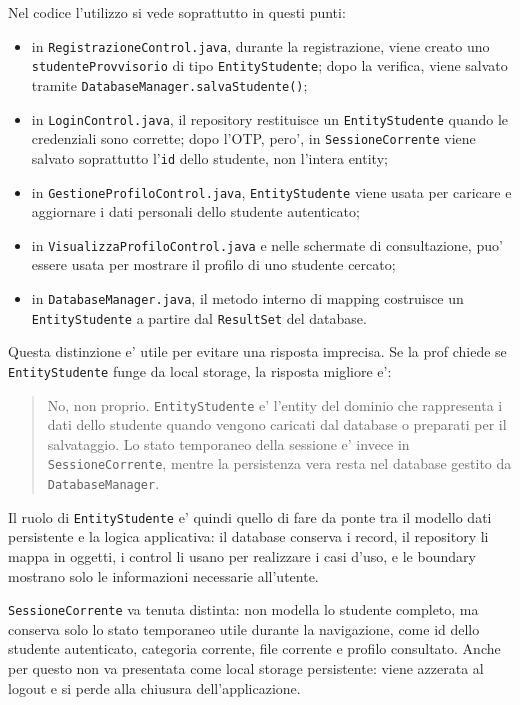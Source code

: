 ﻿\documentclass[11pt,a4paper]{article}
\begin{document}
Nel codice l'utilizzo si vede soprattutto in questi punti:
\begin{itemize}
  \item in \texttt{RegistrazioneControl.java}, durante la registrazione, viene creato uno
  \texttt{studenteProvvisorio} di tipo \texttt{EntityStudente}; dopo la verifica, viene
  salvato tramite \texttt{DatabaseManager.salvaStudente()};
  \item in \texttt{LoginControl.java}, il repository restituisce un
  \texttt{EntityStudente} quando le credenziali sono corrette; dopo l'OTP, pero', in
  \texttt{SessioneCorrente} viene salvato soprattutto l'\texttt{id} dello studente, non
  l'intera entity;
  \item in \texttt{GestioneProfiloControl.java}, \texttt{EntityStudente} viene usata per
  caricare e aggiornare i dati personali dello studente autenticato;
  \item in \texttt{VisualizzaProfiloControl.java} e nelle schermate di consultazione, puo'
  essere usata per mostrare il profilo di uno studente cercato;
  \item in \texttt{DatabaseManager.java}, il metodo interno di mapping costruisce un
  \texttt{EntityStudente} a partire dal \texttt{ResultSet} del database.
\end{itemize}

Questa distinzione e' utile per evitare una risposta imprecisa. Se la prof chiede se
\texttt{EntityStudente} funge da local storage, la risposta migliore e':
\begin{quote}
No, non proprio. \texttt{EntityStudente} e' l'entity del dominio che rappresenta i dati
dello studente quando vengono caricati dal database o preparati per il salvataggio. Lo
stato temporaneo della sessione e' invece in \texttt{SessioneCorrente}, mentre la
persistenza vera resta nel database gestito da \texttt{DatabaseManager}.
\end{quote}

Il ruolo di \texttt{EntityStudente} e' quindi quello di fare da ponte tra il modello dati
persistente e la logica applicativa: il database conserva i record, il repository li mappa
in oggetti, i control li usano per realizzare i casi d'uso, e le boundary mostrano solo le
informazioni necessarie all'utente.

\texttt{SessioneCorrente} va tenuta distinta: non modella lo studente completo, ma conserva
solo lo stato temporaneo utile durante la navigazione, come id dello studente autenticato,
categoria corrente, file corrente e profilo consultato. Anche per questo non va presentata
come local storage persistente: viene azzerata al logout e si perde alla chiusura
dell'applicazione.
\end{document}

